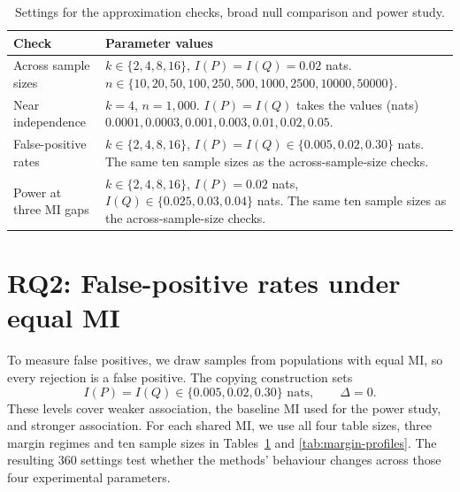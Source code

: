 \begin{table}[!htbp]
\centering
\caption{Settings for the approximation checks, broad null comparison and power study.}
\label{tab:design-primary-grids}
\thesistableformat
\begin{tabularx}{\textwidth}{@{}>{\raggedright\arraybackslash}p{}>{\raggedright\arraybackslash}X@{}}
\toprule
\textbf{Check} & \textbf{Parameter values}\\
\midrule
Across sample sizes &
\(k\in\{2,4,8,16\}\), \(I(P)=I(Q)=0.02\) nats.\newline
\(n\in\{10,20,50,100,250,500,1000,2500,10000,50000\}\).\\
\addlinespace
Near independence &
\(k=4\), \(n=1{,}000\).\newline
\(I(P)=I(Q)\) takes the values (nats)\newline
\(0.0001,0.0003,0.001,0.003,0.01,0.02,0.05\).\\
\addlinespace
False-positive rates &
\(k\in\{2,4,8,16\}\), \(I(P)=I(Q)\in\{0.005,0.02,0.30\}\) nats.\newline
The same ten sample sizes as the across-sample-size checks.\\
\addlinespace
Power at three MI gaps &
\(k\in\{2,4,8,16\}\), \(I(P)=0.02\) nats,\newline
\(I(Q)\in\{0.025,0.03,0.04\}\) nats.\newline
The same ten sample sizes as the across-sample-size checks.\\
\bottomrule
\end{tabularx}
\end{table}

\section{RQ2: False-positive rates under equal MI}
\label{sec:null-design}

To measure false positives, we draw samples from populations with equal
MI, so every rejection is a false positive. The copying construction
sets
\begin{equation}
 I(P)=I(Q)\in\{0.005,0.02,0.30\}\text{ nats},
 \qquad \Delta=0.
 \label{eq:design-balanced-null}
\end{equation}
These levels cover weaker association, the baseline MI used for the power
study, and stronger association. For each shared MI, we use all four
table sizes, three margin regimes and ten sample sizes in
Tables~\ref{tab:design-primary-grids} and \ref{tab:margin-profiles}.
The resulting 360 settings test whether the methods' behaviour changes
across those four experimental parameters.

